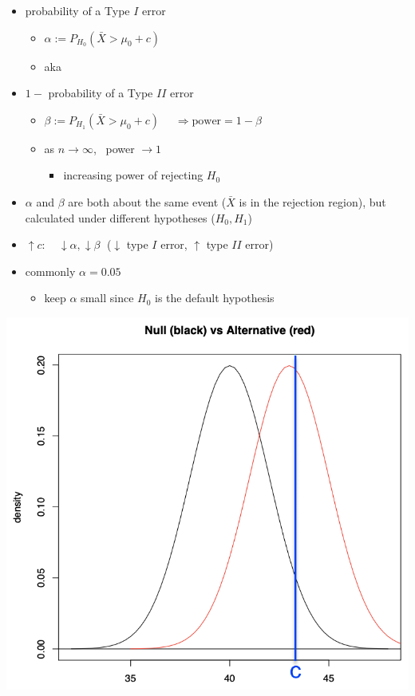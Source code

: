 \documentclass[10pt, landscape]{article}
\newcommand{\Xbar}{\bar{X}}
\begin{document}
\begin{multicols*}{4}
  \begin{itemize}
    \item {} probability of a Type $I$ error
      \begin{itemize}
        \item $\alpha := P_{H_0} (\Xbar > \mu_0 + c)$
        \item aka 
      \end{itemize}
    \item {} $1-$ probability of a Type $II$ error
      \begin{itemize}
        \item $\beta := P_{H_1} (\Xbar > \mu_0 + c)$ $\quad \Rightarrow \text{power} = 1-\beta$
        \item as $n \to \infty$, \ power $\to 1$
          \begin{itemize}
            \item increasing power of rejecting $H_0$
          \end{itemize}
      \end{itemize}
    \item $\alpha$ and $\beta$ are both about the same event ($\Xbar$ is in the rejection region), but calculated under different hypotheses ($H_0, H_1$)
    \item $\uparrow c : \quad \downarrow \alpha, \downarrow \beta \;$ ($\downarrow$ type $I$ error, $\uparrow$ type  $II$ error)
    \item commonly $\alpha = 0.05$
      \begin{itemize}
        \item keep $\alpha$ small since $H_0$ is the default hypothesis
      \end{itemize}
  \end{itemize}

  \begin{tightcenter}
    \includegraphics[width=0.65\linewidth]{st2132-hypothesis-testing-c.png} 
  \end{tightcenter}


\end{multicols*}
\end{document}
